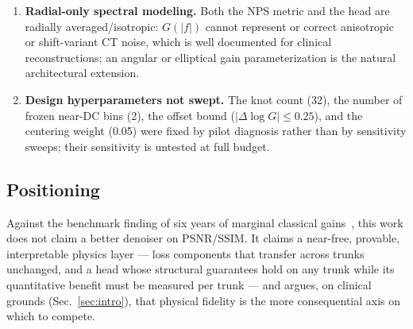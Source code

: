 \begin{enumerate}
  \item \textbf{Radial-only spectral modeling.} Both the NPS metric and the head are radially averaged/isotropic: $G(|f|)$ cannot represent or correct anisotropic or shift-variant CT noise, which is well documented for clinical reconstructions; an angular or elliptical gain parameterization is the natural architectural extension.
  \item \textbf{Design hyperparameters not swept.} The knot count (32), the number of frozen near-DC bins (2), the offset bound ($|\Delta \log G| \le 0.25$), and the centering weight (0.05) were fixed by pilot diagnosis rather than by sensitivity sweeps; their sensitivity is untested at full budget.
\end{enumerate}

\subsection{Positioning}
\label{sec:positioning}

Against the benchmark finding of six years of marginal classical gains~\cite{eulig2024}, this work does not claim a better denoiser on PSNR/SSIM. It claims a near-free, provable, interpretable physics layer --- loss components that transfer across trunks unchanged, and a head whose structural guarantees hold on any trunk while its quantitative benefit must be measured per trunk --- and argues, on clinical grounds (Sec.~\ref{sec:intro}), that physical fidelity is the more consequential axis on which to compete.
